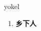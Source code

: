 
\begin{frame}
{\huge yokel}
\begin{center}
\begin{enumerate}\Large
  \item \textbf{乡下人}
\end{enumerate}
\end{center}
\end{frame}
